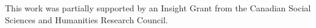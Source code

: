 \documentclass{pnastwo}
\begin{document}
\begin{article}
\begin{materials}
\end{materials}

\begin{acknowledgments}
This work was partially supported by an Insight Grant from the Canadian Social Sciences and Humanities Research Council.
\end{acknowledgments}




%
%
%
%
%
%
%
%
%
%
%

\end{article}
\end{document}
